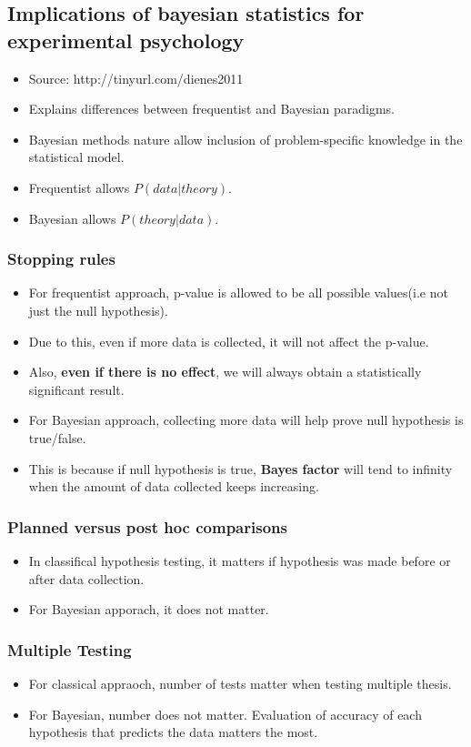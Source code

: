 \documentclass[a4paper]{article}
\begin{document}
\subsection{Implications of bayesian statistics for experimental psychology}
\begin{itemize}
    \item Source: http://tinyurl.com/dienes2011
    \item Explains differences between frequentist and Bayesian paradigms.
    \item Bayesian methods nature allow inclusion of problem-specific knowledge in the statistical model.
    \item Frequentist allows $P(data|theory)$.
    \item Bayesian allows  $P(theory|data)$.
\end{itemize}
\subsubsection{Stopping rules}
\begin{itemize}
    \item For frequentist approach, p-value is allowed to be all possible values(i.e not just the null hypothesis).
    \item Due to this, even if more data is collected, it will not affect the p-value.
    \item Also, \textbf{even if there is no effect}, we will always obtain a statistically significant result. 
    \item For Bayesian approach, collecting more data will help prove null hypothesis is true/false.
    \item This is because if null hypothesis is true, \textbf{Bayes factor} will tend to infinity when the amount of data collected keeps increasing. 
\end{itemize}
\subsubsection{Planned versus post hoc comparisons}
\begin{itemize}
    \item In classifical hypothesis testing, it matters if hypothesis was made before or after data collection.
    \item For Bayesian apporach, it does not matter.
\end{itemize}
\subsubsection{Multiple Testing}
\begin{itemize}
    \item For classical appraoch, number of tests matter when testing multiple thesis.
    \item For Bayesian, number does not matter. Evaluation of accuracy of each hypothesis that predicts the data matters the most.
\end{itemize}
\end{document}
